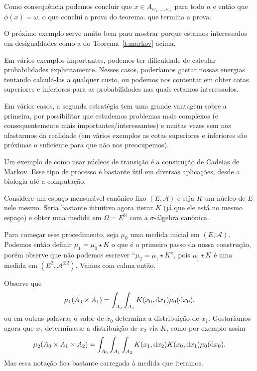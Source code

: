  \medskip

 Como consequência podemos concluir que $x\in A_{w_1, \dots, w_n}$ para todo $n$ e então que $\phi(x)=\omega$, o que conclui a prova do teorema.
  que termina a prova.


O próximo exemplo serve muito bem para mostrar porque estamos interessados em desigualdades como a do Teorema~\ref{t:markov} acima.

Em vários exemplos importantes, podemos ter dificuldade de calcular probabilidades explicitamente.
Nesses casos, poderíamos gastar nossas energias tentando calculá-las a qualquer custo,
ou podemos nos contentar em obter cotas superiores e inferiores para as probabilidades nas quais estamos interessados.

Em vários casos, a segunda estratégia tem uma grande vantagem sobre a primeira, por possibilitar que estudemos problemas mais complexos
(e consequentemente mais importantes/interessantes) e muitas vezes sem nos afastarmos da realidade
(em vários exemplos as cotas superiores e inferiores são próximas o suficiente para que não nos preocupemos).





Um exemplo de como usar núcleos de transição é a construção de Cadeias de Markov.
Esse tipo de processo é bastante útil em diversas aplicações, desde a biologia até a computação.

Considere um espaço mensurável canônico fixo $(E, \mathcal{A})$ e seja $K$ um núcleo de $E$ nele mesmo.
Seria bastante intuitivo agora iterar $K$ (já que ele está no mesmo espaço)
e obter uma medida em $\Omega =E^{\mathbb{N}}$ com a $\sigma$-álgebra canônica.

Para começar esse procedimento, seja $\mu_0$ uma medida inicial em $(E, \mathcal{A})$.
Podemos então definir $\mu_1 = \mu_0 \star K$ o que é o primeiro passo da nossa construção, porém observe que não podemos escrever ``$\mu_2 = \mu_1 \star K$'', pois $\mu_1 \star K$ é uma medida em $(E^2, \mathcal{A}^{\otimes 2})$.
Vamos com calma então.

Observe que
\begin{equation}
  \mu_1(A_0 \times A_1) = \int_{A_0} \int_{A_1} K(x_0, \mathop{}\!\mathrm{d} x_1) \mu_0(\mathop{}\!\mathrm{d} x_0),
\end{equation}
ou em outras palavras o valor de $x_0$ determina a distribuição de $x_1$.
Gostaríamos agora que $x_1$ determinasse a distribuição de $x_2$ via $K$, como por exemplo assim
\begin{equation}
  \mu_2(A_0 \times A_1 \times A_2) = \int_{A_0} \int_{A_1} \int_{A_2} K(x_1, \mathop{}\!\mathrm{d} x_2) K(x_0, \mathop{}\!\mathrm{d} x_1) \mu_0 (\mathop{}\!\mathrm{d} x_0).
\end{equation}
Mas essa notação fica bastante carregada à medida que iteramos.

